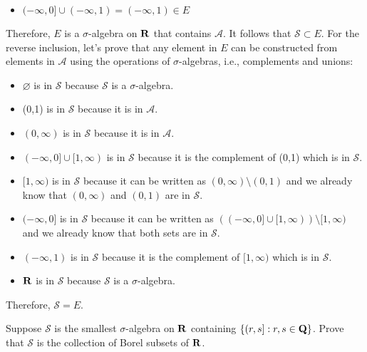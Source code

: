 \begin{solution}
\begin{itemize}
\begin{itemize}
\begin{itemize}
                \item $(-\infty, 0] \cup (-\infty, 1) = (-\infty, 1) \in E$
            \end{itemize}
        \end{itemize}
        Therefore, $E$ is a $\sigma$-algebra on $\mathbf{R}$ that contains $\mathcal{A}$. It follows that $\mathcal{S} \subset E$. For the reverse inclusion, let's prove that any element in $E$ can be constructed from elements in $\mathcal{A}$ using the operations of $\sigma$-algebras, i.e., complements and unions:
        \begin{itemize}
            \item $\varnothing$ is in $\mathcal{S}$ because $\mathcal{S}$ is a $\sigma$-algebra.
            \item (0,1) is in $\mathcal{S}$ because it is in $\mathcal{A}$.
            \item $(0, \infty)$ is in $\mathcal{S}$ because it is in $\mathcal{A}$.
            \item $(-\infty, 0]\cup[1, \infty)$ is in $\mathcal{S}$ because it is the complement of (0,1) which is in $\mathcal{S}$.
            \item $[1, \infty)$ is in $\mathcal{S}$ because it can be written as $(0, \infty) \setminus (0,1)$ and we already know that $(0, \infty)$ and $(0,1)$ are in $\mathcal{S}$.
            \item $(-\infty, 0]$ is in $\mathcal{S}$ because it can be written as $((-\infty, 0]\cup[1, \infty)) \setminus [1, \infty)$ and we already know that both sets are in $\mathcal{S}$.
            \item $(-\infty, 1)$ is in $\mathcal{S}$ because it is the complement of $[1, \infty)$ which is in $\mathcal{S}$.
            \item $\mathbf{R}$ is in $\mathcal{S}$ because $\mathcal{S}$ is a $\sigma$-algebra.
        \end{itemize}
        Therefore, $\mathcal{S} = E$.\\
    \end{itemize}
\end{solution}

\begin{exercise}
    Suppose $\mathcal{S}$ is the smallest $\sigma$-algebra on $\mathbf{R}$ containing $\{(r, s]:r,s\in\mathbf{Q}\}$. Prove that $\mathcal{S}$ is the collection of Borel subsets of $\mathbf{R}$. \\
\end{exercise}

